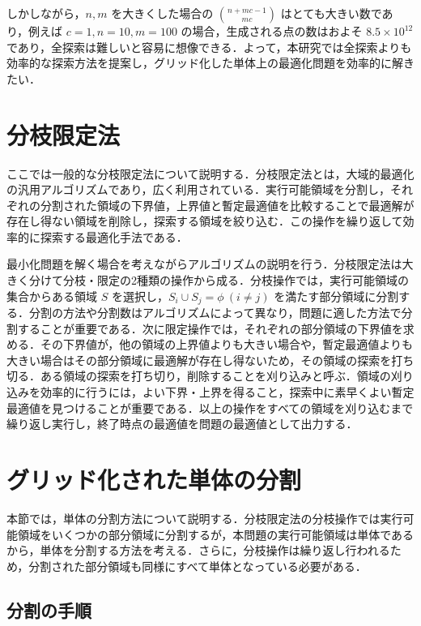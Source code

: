 \documentclass[a4paper,11pt]{jreport}
\begin{document}
しかしながら，$ n, m $ を大きくした場合の $ \binom{n + mc - 1}{mc} $ はとても大きい数であり，例えば $ c = 1, n = 10, m = 100 $ の場合，生成される点の数はおよそ $ 8.5 \times 10^{12} $ であり，全探索は難しいと容易に想像できる．よって，本研究では全探索よりも効率的な探索方法を提案し，グリッド化した単体上の最適化問題を効率的に解きたい．\par

\section{分枝限定法} \label{sec:bnb}

ここでは一般的な分枝限定法について説明する．分枝限定法とは，大域的最適化の汎用アルゴリズムであり，広く利用されている．実行可能領域を分割し，それぞれの分割された領域の下界値，上界値と暫定最適値を比較することで最適解が存在し得ない領域を削除し，探索する領域を絞り込む．この操作を繰り返して効率的に探索する最適化手法である．\par
最小化問題を解く場合を考えながらアルゴリズムの説明を行う．分枝限定法は大きく分けて分枝・限定の2種類の操作から成る．分枝操作では，実行可能領域の集合からある領域 $ S $ を選択し，$ S_i \cup S_j = \phi \: (i \neq j) $ を満たす部分領域に分割する．分割の方法や分割数はアルゴリズムによって異なり，問題に適した方法で分割することが重要である．次に限定操作では，それぞれの部分領域の下界値を求める．その下界値が，他の領域の上界値よりも大きい場合や，暫定最適値よりも大きい場合はその部分領域に最適解が存在し得ないため，その領域の探索を打ち切る．ある領域の探索を打ち切り，削除することを刈り込みと呼ぶ．領域の刈り込みを効率的に行うには，よい下界・上界を得ること，探索中に素早くよい暫定最適値を見つけることが重要である．以上の操作をすべての領域を刈り込むまで繰り返し実行し，終了時点の最適値を問題の最適値として出力する．\par

\section{グリッド化された単体の分割} \label{sec:partition}

本節では，単体の分割方法について説明する．分枝限定法の分枝操作では実行可能領域をいくつかの部分領域に分割するが，本問題の実行可能領域は単体であるから，単体を分割する方法を考える．さらに，分枝操作は繰り返し行われるため，分割された部分領域も同様にすべて単体となっている必要がある．\par

\subsection{分割の手順}
\end{document}
